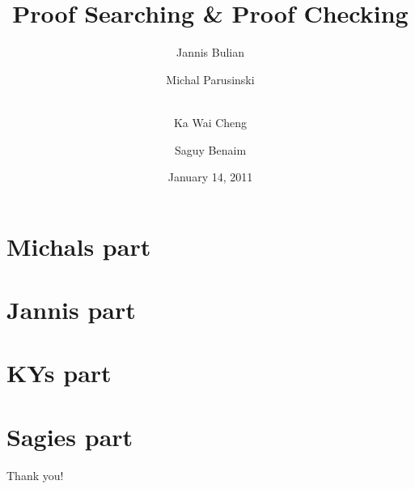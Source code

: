 \documentclass[usenames,dvipsnames]{beamer}
\title{Proof Searching \& Proof Checking}
\author[Jannis Bulian \and\\ Michal Parusinski \and\\ Ka Wai Cheng \and\\ Saguy Benaim]{Jannis Bulian \and Michal Parusinski \and \\ Ka Wai Cheng \and Saguy Benaim}
\date{January 14, 2011}
\institute{Imperial College London\\
           Department of Computing}
\begin{document}
\maketitle
\tableofcontents

\section{Michals part}

\section{Jannis part}

\section{KYs part}

\section{Sagies part}


\appendix

\begin{frame}
  \begin{center}
    {\Huge Thank you!}
  \end{center}
\end{frame}

\begin{frame}
  
  
\end{frame}
\end{document}
